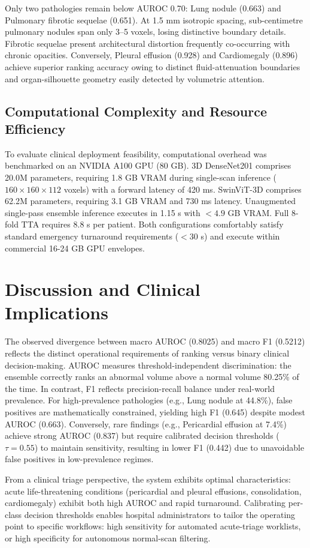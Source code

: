 \documentclass[runningheads]{llncs}
\begin{document}
Only two pathologies remain below AUROC 0.70: Lung nodule (0.663) and Pulmonary fibrotic sequelae (0.651). At 1.5 mm isotropic spacing, sub-centimetre pulmonary nodules span only 3--5 voxels, losing distinctive boundary details. Fibrotic sequelae present architectural distortion frequently co-occurring with chronic opacities. Conversely, Pleural effusion (0.928) and Cardiomegaly (0.896) achieve superior ranking accuracy owing to distinct fluid-attenuation boundaries and organ-silhouette geometry easily detected by volumetric attention.

\subsection{Computational Complexity and Resource Efficiency}
To evaluate clinical deployment feasibility, computational overhead was benchmarked on an NVIDIA A100 GPU (80 GB). 3D DenseNet201 comprises 20.0M parameters, requiring 1.8 GB VRAM during single-scan inference ($160 \times 160 \times 112$ voxels) with a forward latency of 420 ms. SwinViT-3D comprises 62.2M parameters, requiring 3.1 GB VRAM and 730 ms latency. Unaugmented single-pass ensemble inference executes in 1.15 s with $<4.9$ GB VRAM. Full 8-fold TTA requires 8.8 s per patient. Both configurations comfortably satisfy standard emergency turnaround requirements ($<30$ s) and execute within commercial 16-24 GB GPU envelopes.

\section{Discussion and Clinical Implications}
The observed divergence between macro AUROC (0.8025) and macro F1 (0.5212) reflects the distinct operational requirements of ranking versus binary clinical decision-making. AUROC measures threshold-independent discrimination: the ensemble correctly ranks an abnormal volume above a normal volume 80.25\% of the time. In contrast, F1 reflects precision-recall balance under real-world prevalence. For high-prevalence pathologies (e.g., Lung nodule at 44.8\%), false positives are mathematically constrained, yielding high F1 (0.645) despite modest AUROC (0.663). Conversely, rare findings (e.g., Pericardial effusion at 7.4\%) achieve strong AUROC (0.837) but require calibrated decision thresholds ($\tau = 0.55$) to maintain sensitivity, resulting in lower F1 (0.442) due to unavoidable false positives in low-prevalence regimes.

From a clinical triage perspective, the system exhibits optimal characteristics: acute life-threatening conditions (pericardial and pleural effusions, consolidation, cardiomegaly) exhibit both high AUROC and rapid turnaround. Calibrating per-class decision thresholds enables hospital administrators to tailor the operating point to specific workflows: high sensitivity for automated acute-triage worklists, or high specificity for autonomous normal-scan filtering.
\end{document}
